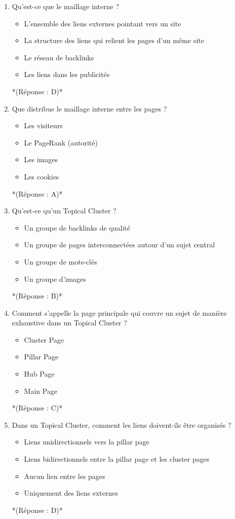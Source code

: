 \documentclass[12pt,a4paper,twoside]{report}
\begin{document}
\begin{enumerate}
\item Qu'est-ce que le maillage interne ?
\begin{itemize}
\item[A)] L'ensemble des liens externes pointant vers un site
\item[B)] La structure des liens qui relient les pages d'un même site
\item[C)] Le réseau de backlinks
\item[D)] Les liens dans les publicités
\end{itemize}
*(Réponse : D)*

\item Que distribue le maillage interne entre les pages ?
\begin{itemize}
\item[A)] Les visiteurs
\item[B)] Le PageRank (autorité)
\item[C)] Les images
\item[D)] Les cookies
\end{itemize}
*(Réponse : A)*

\item Qu'est-ce qu'un Topical Cluster ?
\begin{itemize}
\item[A)] Un groupe de backlinks de qualité
\item[B)] Un groupe de pages interconnectées autour d'un sujet central
\item[C)] Un groupe de mots-clés
\item[D)] Un groupe d'images
\end{itemize}
*(Réponse : B)*

\item Comment s'appelle la page principale qui couvre un sujet de manière exhaustive dans un Topical Cluster ?
\begin{itemize}
\item[A)] Cluster Page
\item[B)] Pillar Page
\item[C)] Hub Page
\item[D)] Main Page
\end{itemize}
*(Réponse : C)*

\item Dans un Topical Cluster, comment les liens doivent-ils être organisés ?
\begin{itemize}
\item[A)] Liens unidirectionnels vers la pillar page
\item[B)] Liens bidirectionnels entre la pillar page et les cluster pages
\item[C)] Aucun lien entre les pages
\item[D)] Uniquement des liens externes
\end{itemize}
*(Réponse : D)*


\end{enumerate}
\end{document}

